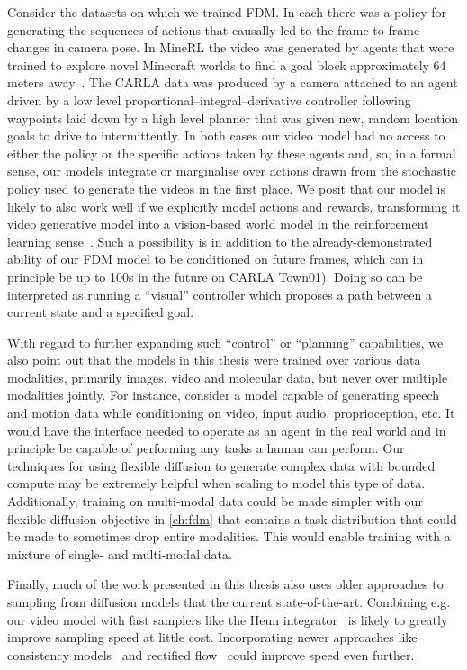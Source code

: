 Consider the datasets on which we trained FDM. In each there was a policy for generating the sequences of actions that causally led to the frame-to-frame changes in camera pose. In MineRL the video was generated by agents that were trained to explore novel Minecraft worlds to find a goal block approximately 64 meters away~\citep{saxena2021clockwork}. The CARLA data was produced by a camera attached to an agent driven by a low level proportional–integral–derivative controller following waypoints laid down by a high level planner that was given new, random location goals to
drive to intermittently. In both cases our video model had no access to either the policy or the specific actions taken by these agents and, so, in a formal sense, our models integrate or marginalise over actions drawn from the stochastic policy used to generate the videos in the first place. We posit that our model is likely to also work well if we explicitly model actions and rewards, transforming it video generative model into a vision-based world model in the reinforcement learning sense~\citep{kaiser2019model}. Such a possibility is in addition to the already-demonstrated ability of our FDM model to be conditioned on future frames, which can in principle be up to 100s in the future on CARLA Town01). Doing so can be interpreted as running a “visual” controller which proposes a path between a current state and a specified goal.

With regard to further expanding such ``control'' or ``planning'' capabilities, we also point out that the models in this thesis were trained over various data modalities, primarily images, video and molecular data, but never over multiple modalities jointly. For instance, consider a model capable of generating speech and motion data while conditioning on video, input audio, proprioception, etc. It would have the interface needed to operate as an agent in the real world and in principle be capable of performing any tasks a human can perform. Our techniques for using flexible diffusion to generate complex data with bounded compute may be extremely helpful when scaling to model this type of data. Additionally, training on multi-modal data could be made simpler with our flexible diffusion objective in \cref{ch:fdm} that contains a task distribution that could be made to sometimes drop entire modalities. This would enable training with a mixture of single- and multi-modal data.

Finally, much of the work presented in this thesis also uses older approaches to sampling from diffusion models that the current state-of-the-art. Combining e.g. our video model with fast samplers like the Heun integrator~\citep{karras2022elucidating} is likely to greatly improve sampling speed at little cost. Incorporating newer approaches like consistency models~\citep{song2023consistency} and rectified flow~\citep{esser2024scaling} could improve speed even further.



